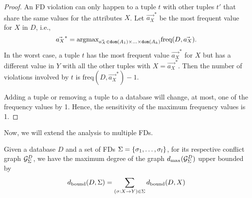 \begin{proof}
An FD violation can only happen to a tuple $t$ with other tuples $t'$ that share the same values for the attributes $X$. 
Let $\vec{a_X}^*$ be the most frequent value for $X$ in $D$, i.e., 
$$\vec{a_X}^*=\text{argmax}_{\vec{a_X} \in {\tt dom}(A_1) \times \ldots \times {\tt dom}(A_k) } \normalfont{\text{freq}}(D, \vec{a_X}).$$
In the worst case, a tuple $t$ has the most frequent value $\vec{a_X}^*$ for $X$ but has a different value in $Y$ with all the other tuples with $X=\vec{a_X}^*$. Then the number of violations involved by $t$ is $\text{freq}(D,\vec{a_X}^*)-1$.

Adding a tuple or removing a tuple to a database will change, at most, one of the frequency values by 1. Hence, the sensitivity of  the maximum frequency values is 1.
\end{proof}

Now, we will extend the analysis to multiple FDs. 
\begin{theorem}\label{theorem:fd_theta}
Given a database $D$ and a set of FDs 
${\Sigma}=\{\sigma_1,\ldots,\sigma_l \}$, for its respective conflict graph ${\mathcal{G}_{{\Sigma}}^{D}}$, we have the maximum degree of the graph $d_{\max}({\mathcal{G}_{{\Sigma}}^{D}})$ upper bounded by
\begin{eqnarray}
    d_{\normalfont{\text{bound}}}(D,\Sigma) 
     =      \sum_{(\sigma: X\rightarrow Y)\in \Sigma} 
         d_{\normalfont{\text{bound}}}(D,X)
\end{eqnarray}
\end{theorem}


